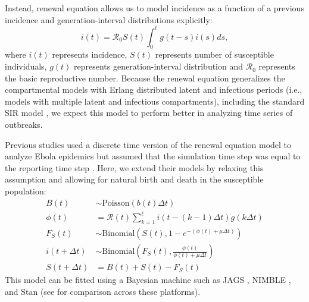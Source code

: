 \documentclass{article}
\begin{document}
Instead, renewal equation allows us to model incidence as a function of a previous incidence and generation-interval distributions explicitly:
\begin{equation}
i(t) = \mathcal R_0 S(t) \int_0^t g(t-s) i(s) ds,
\end{equation}
where $i(t)$ represents incidence, $S(t)$ represents number of susceptible individuals, $g(t)$ represents generation-interval distribution and $\mathcal R_0$ represents the basic reproductive number.
Because the renewal equation generalizes the compartmental models with Erlang distributed latent and infectious periods (i.e., models with multiple latent and infectious compartments), including the standard SIR model \citep{champredon2018equivalence}, we expect this model to perform better in analyzing time series of outbreaks.

Previous studies used a discrete time version of the renewal equation model to analyze Ebola epidemics but assumed that the simulation time step was equal to the reporting time step \citep{li2018fitting, champredon2018two}.
Here, we extend their models by relaxing this assumption and allowing for natural birth and death in the susceptible population:
\begin{equation}
\begin{aligned}
B(t) &\sim \mathrm{Poisson}(b(t) \Delta t)\\
\phi(t) &= \mathcal R(t) \sum_{k=1}^\ell i(t - (k-1) \Delta t) g(k \Delta t)\\
F_{S}(t) &\sim \mathrm{Binomial}\left(S(t), 1 - e^{-(\phi(t) + \mu \Delta t)} \right)\\
i(t + \Delta t) &\sim \mathrm{Binomial}\left(F_{S}(t), \frac{\phi(t)}{\phi(t) + \mu \Delta t} \right)\\
S(t + \Delta t) &= B(t) + S(t) - F_{S}(t)
\end{aligned}
\end{equation}
This model can be fitted using a Bayesian machine such as JAGS \citep{plummer2003jags}, NIMBLE \citep{de2017programming}, and Stan \citep{carpenter2017stan} (see \cite{li2018fitting} for comparison across these platforms).
\end{document}
